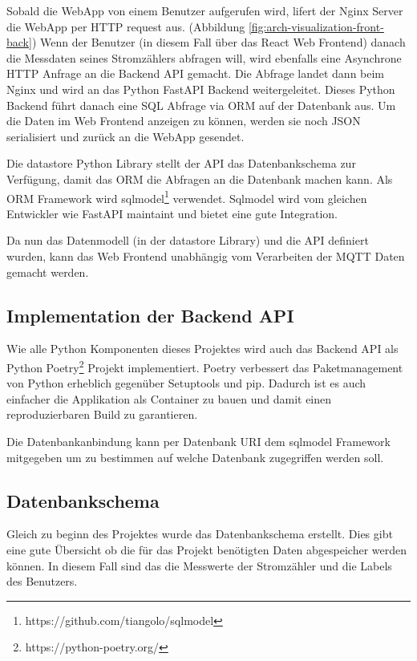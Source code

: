 Sobald die WebApp von einem Benutzer aufgerufen wird, lifert der Nginx Server
die WebApp per \ac{HTTP} request aus. (Abbildung \ref{fig:arch-visualization-front-back})
Wenn der Benutzer (in diesem Fall über das React Web Frontend) danach die Messdaten seines
Stromzählers abfragen will, wird ebenfalls eine Asynchrone \ac{HTTP} Anfrage an die Backend \ac{API} gemacht.
Die Abfrage landet dann beim Nginx und wird an das Python FastAPI Backend weitergeleitet.
Dieses Python Backend führt danach eine SQL Abfrage via \ac{ORM} auf der Datenbank aus.
Um die Daten im Web Frontend anzeigen zu können, werden sie noch \ac{JSON} serialisiert
und zurück an die WebApp gesendet.

Die datastore Python Library stellt der \ac{API} das Datenbankschema zur Verfügung,
damit das \ac{ORM} die Abfragen an die Datenbank machen kann.
Als \ac{ORM} Framework wird sqlmodel\footnote{https://github.com/tiangolo/sqlmodel} verwendet.
Sqlmodel wird vom gleichen Entwickler wie FastAPI maintaint und bietet eine gute Integration.

Da nun das Datenmodell (in der datastore Library) und die \ac{API} definiert wurden,
kann das Web Frontend unabhängig vom Verarbeiten der \ac{MQTT} Daten gemacht werden.

\subsection{Implementation der Backend \ac{API}}

Wie alle Python Komponenten dieses Projektes wird auch das Backend \ac{API}
als Python Poetry\footnote{https://python-poetry.org/} Projekt implementiert.
Poetry verbessert das Paketmanagement von Python erheblich gegenüber Setuptools
und pip. \cite{python_poetry}
Dadurch ist es auch einfacher die Applikation als Container zu bauen und
damit einen reproduzierbaren Build zu garantieren.

Die Datenbankanbindung kann per Datenbank \ac{URI} dem sqlmodel Framework
mitgegeben um zu bestimmen auf welche Datenbank zugegriffen werden soll.

\subsection{Datenbankschema}

Gleich zu beginn des Projektes wurde das Datenbankschema erstellt.
Dies gibt eine gute Übersicht ob die für das Projekt benötigten Daten
abgespeicher werden können. In diesem Fall sind das die Messwerte der Stromzähler
und die Labels des Benutzers.

